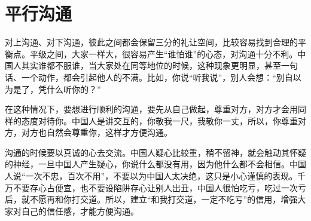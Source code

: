 \documentclass[fontset=fandol, a4paper, 12pt, openright]{ctexbook}
\begin{document}
\section{平行沟通}

对上沟通、对下沟通，彼此之间都会保留三分的礼让空间，比较容易找到合理的平衡点。平级之间，大家一样大，很容易产生“谁怕谁”的心态，对沟通十分不利。中国人其实谁都不服谁，当大家处在同等地位的时候，这种现象更明显，甚至一句话、一个动作，都会引起他人的不满。比如，你说“听我说”，别人会想：“别自以为是了，凭什么听你的？”

在这种情况下，要想进行顺利的沟通，要先从自己做起，尊重对方，对方才会用同样的态度对待你。中国人是讲交互的，你敬我一尺，我敬你一丈，所以，你尊重对方，对方也自然会尊重你，这样才方便沟通。

沟通的时候要以真诚的心去交流。中国人疑心比较重，稍不留神，就会触动其怀疑的神经，一旦中国人产生疑心，你说什么都没有用，因为他什么都不会相信。中国人说“一次不忠，百次不用”，不要以为中国人太决绝，这只是小心谨慎的表现。千万不要存心占便宜，也不要设陷阱存心让别人出丑，中国人很怕吃亏，吃过一次亏后，就不愿再和你打交道。所以，建立“和我打交道，一定不吃亏”的信用，增强大家对自己的信任感，才能方便沟通。
\end{document}

